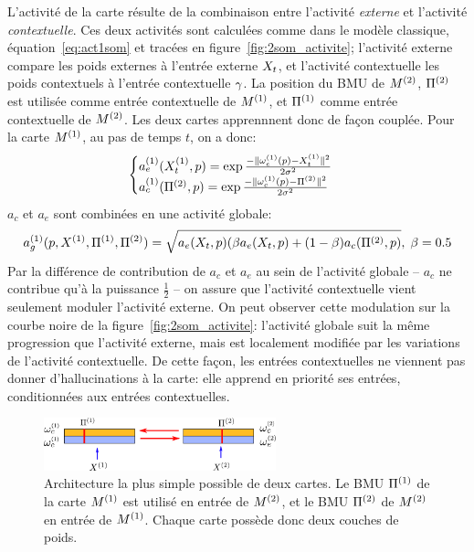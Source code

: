 L'activité de la carte résulte de la combinaison entre l'activité \emph{externe} et l'activité \emph{contextuelle}. Ces deux activités sont calculées comme dans le modèle classique, équation~\ref{eq:act1som} et tracées en figure~\ref{fig:2som_activite}; l'activité externe compare les poids externes à l'entrée externe $X_t$, et l'activité contextuelle les poids contextuels à l'entrée contextuelle $\gamma$. 
La position du BMU de $M^{({2})}$, $\Pi^{({2})}$ est utilisée comme entrée contextuelle de $M^{({1})}$, et $\Pi^{({1})}$ comme entrée contextuelle de $M^{({2})}$. Les deux cartes apprennnent donc de façon couplée.
Pour la carte $M^{({1})}$, au pas de temps $t$, on a donc:
\begin{equation}
\label{eq:activite}
\begin{cases}
a_e^{({1})}(X_t^{({1})},p) = \exp\frac{-\lVert \omega_e^{({1})}(p)-X^{({1})}_t \rVert^2}{2\sigma^2} \\
a_c^{({1})}(\Pi^{({2})},p) = \exp\frac{-\lVert \omega_c^{({1})}(p)-\Pi^{({2})} \rVert ^2}{2\sigma^2}\\
\end{cases}
\end{equation}
$a_c$ et $a_e$ sont combinées en une activité globale:
\begin{equation}
a_g^{({1})}(p,X^{({1})},\Pi^{({1})},\Pi^{({2})}) = \sqrt{a_e(X_t,p)(\beta a_e(X_t,p) + (1-\beta) a_c(\Pi^{({2})},p)}, \; \beta=0.5
\end{equation}
Par la différence de contribution de $a_c$ et $a_e$ au sein de l'activité globale -- $a_c$ ne contribue qu'à la puissance $\frac{1}{2}$ -- on assure que l'activité contextuelle vient seulement moduler l'activité externe. On peut observer cette modulation sur la courbe noire de la figure~\ref{fig:2som_activite}: l'activité globale suit la même progression que l'activité externe, mais est localement modifiée par les variations de l'activité contextuelle. De cette façon, les entrées contextuelles ne viennent pas donner d'hallucinations à la carte: elle apprend en priorité ses entrées, conditionnées aux entrées contextuelles.
\begin{figure}
\centering
\includegraphics[width=0.6\textwidth]{archi_2som}
\caption{Architecture la plus simple possible de deux cartes. Le BMU $\Pi^{({1})}$ de la carte $M^{({1})}$ est utilisé en entrée de $M^{({2})}$, et le BMU $\Pi^{({2})}$ de $M^{({2})}$ en entrée de $M^{({1})}$. Chaque carte possède donc deux couches de poids. \label{fig:2som_archi}}
\end{figure}
